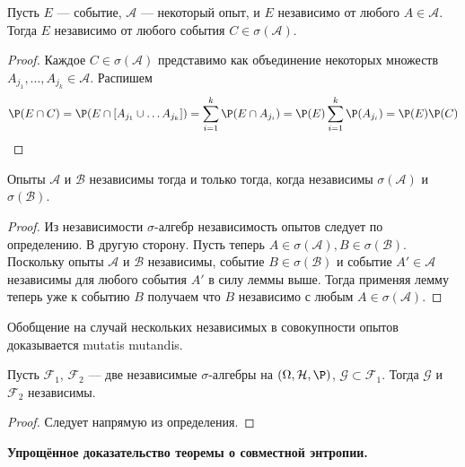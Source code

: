 \begin{lemma*}
    Пусть \(E\) --- событие, \(\mathcal{A}\) --- некоторый опыт, и \(E\) независимо от любого \(A\in\mathcal{A}\). Тогда \(E\) независимо от любого события \(C \in \sigma(\mathcal{A})\).
\end{lemma*}
\begin{proof}
	Каждое \(C \in \sigma(\mathcal{A})\) представимо как объединение некоторых множеств $A_{j_1}, \ldots, A_{j_k} \in \mathcal{A}$. Распишем
	\[
		\P(E \cap C) = \P(E \cap [A_{j_1} \cup \ldots A_{j_k}]) = \sum_{i = 1}^{k} \P(E \cap A_{j_i}) = \P(E) \sum_{i = 1}^{k} \P(A_{j_i}) = \P(E)\P(C)
	\]
\end{proof}
\begin{corollary*}
	Опыты $\mathcal{A}$ и $\mathcal{B}$ независимы тогда и только тогда, когда независимы $\sigma(\mathcal{A})$ и $\sigma(\mathcal{B})$.
\end{corollary*}
\begin{proof}
	Из независимости $\sigma$-алгебр независимость опытов следует по определению. В другую сторону. Пусть теперь $A \in \sigma(\mathcal{A}), B \in \sigma(\mathcal{B})$. Поскольку опыты $\mathcal{A}$ и $\mathcal{B}$ независимы, событие $B \in \sigma(\mathcal{B})$ и событие $A' \in \mathcal{A}$ независимы для любого события $A'$ в силу леммы выше. Тогда применяя лемму теперь уже к событию $B$ получаем что $B$ независимо с любым $A \in \sigma(\mathcal{A})$.
\end{proof}
\begin{remark}
	Обобщение на случай нескольких независимых в совокупности опытов доказывается mutatis mutandis.
\end{remark}
\begin{proposition*}
	Пусть $\mathcal{F}_1$, $\mathcal{F}_2$ --- две независимые $\sigma$-алгебры на \((\Omega,\mathcal{H},\P)\), $\mathcal{G} \subset \mathcal{F}_1$. Тогда $\mathcal{G}$ и $\mathcal{F}_2$ независимы.
\end{proposition*}
\begin{proof}
	Следует напрямую из определения.
\end{proof}
\bigskip

\noindent\textbf{Упрощённое доказательство теоремы о совместной энтропии.}

